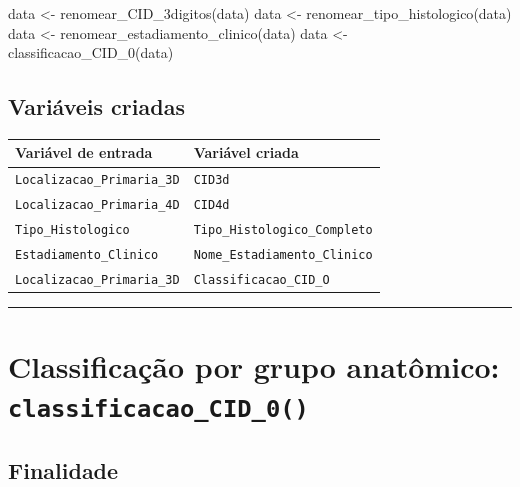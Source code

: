 \documentclass[
  brazilian,
  a4paper,
  oneside]{scrbook}
\newenvironment{Shaded}{\begin{snugshade}}{\end{snugshade}}
\newcommand{\FunctionTok}[1]{\textcolor[rgb]{0.28,0.35,0.67}{#1}}
\newcommand{\NormalTok}[1]{\textcolor[rgb]{0.00,0.23,0.31}{#1}}
\newcommand{\OtherTok}[1]{\textcolor[rgb]{0.00,0.23,0.31}{#1}}
\newcounter{none} %
\begin{document}
\begin{Shaded}
\begin{Highlighting}[]
\NormalTok{data }\OtherTok{\textless{}{-}} \FunctionTok{renomear\_CID\_3digitos}\NormalTok{(data)}
\NormalTok{data }\OtherTok{\textless{}{-}} \FunctionTok{renomear\_tipo\_histologico}\NormalTok{(data)}
\NormalTok{data }\OtherTok{\textless{}{-}} \FunctionTok{renomear\_estadiamento\_clinico}\NormalTok{(data)}
\NormalTok{data }\OtherTok{\textless{}{-}} \FunctionTok{classificacao\_CID\_0}\NormalTok{(data)}
\end{Highlighting}
\end{Shaded}

\subsection{Variáveis criadas}\label{variuxe1veis-criadas}

{\def\LTcaptype{none} %
\begin{longtable}[]{@{}ll@{}}
\toprule\noalign{}
Variável de entrada & Variável criada \\
\midrule\noalign{}
\endhead
\bottomrule\noalign{}
\endlastfoot
\texttt{Localizacao\_Primaria\_3D} & \texttt{CID3d} \\
\texttt{Localizacao\_Primaria\_4D} & \texttt{CID4d} \\
\texttt{Tipo\_Histologico} & \texttt{Tipo\_Histologico\_Completo} \\
\texttt{Estadiamento\_Clinico} & \texttt{Nome\_Estadiamento\_Clinico} \\
\texttt{Localizacao\_Primaria\_3D} & \texttt{Classificacao\_CID\_O} \\
\end{longtable}
}

\begin{center}\rule{0.5\linewidth}{0.5pt}\end{center}

\section{\texorpdfstring{Classificação por grupo anatômico:
\texttt{classificacao\_CID\_0()}}{Classificação por grupo anatômico: classificacao\_CID\_0()}}\label{classificauxe7uxe3o-por-grupo-anatuxf4mico-classificacao_cid_0}

\subsection{Finalidade}\label{finalidade-4}
\end{document}

